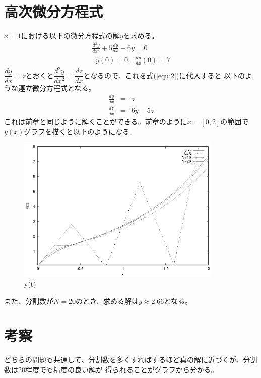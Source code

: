 \documentclass[titlepage]{jsarticle}
\begin{document}

\section{高次微分方程式}
$x=1$における以下の微分方程式の解$y$を求める。
\begin{eqnarray}
	\frac{d^2y}{dx^2}+5\frac{dy}{dx}-6y = 0 \label{equ:2} \\
	\;\; y(0) = 0,\;\;\frac{dy}{dx}(0)=7 \nonumber
\end{eqnarray}
$\dfrac{dy}{dx} = z$とおくと$\dfrac{d^2y}{dx^2} = \dfrac{dz}{dx}$となるので、これを式(\ref{equ:2})に代入すると
以下のような連立微分方程式となる。
\begin{eqnarray}
	\frac{dy}{dx} &=& z \nonumber \\
	\frac{dz}{dx} &=&  6y -5z \nonumber
\end{eqnarray}
これは前章と同じように解くことができる。前章のように$x=[0,2]$の範囲で$y(x)$グラフを描くと以下のようになる。
\begin{figure}[H]
	\centering
	\includegraphics[height=7cm]{2/y(t).eps}
	\caption{y(t)}
	\label{fig:2y(t)}
\end{figure}
また、分割数が$N=20$のとき、求める解は$y\approx 2.66$となる。

\section{考察}
どちらの問題も共通して、分割数を多くすればするほど真の解に近づくが、分割数は20程度でも精度の良い解が
得られることがグラフから分かる。
\end{document}
